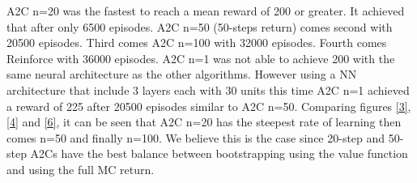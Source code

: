 \documentclass[12pt]{article}
\begin{document}
\begin{enumerate}
		A2C n=20 was the fastest to reach a mean reward of 200 or greater. It achieved that after only 6500 episodes.
		A2C n=50 (50-steps return) comes second with 20500 episodes.  
		Third comes A2C n=100 with 32000 episodes. 
		Fourth comes Reinforce with 36000 episodes. 
		A2C n=1 was not able to achieve 200 with the same neural architecture as the other algorithms. However using a NN architecture that include 3 layers each with 30 units this time A2C n=1 achieved a reward of 225 after 20500 episodes similar to A2C n=50.
		Comparing figures \ref{3}, \ref{4} and \ref{6},
		it can be seen that A2C n=20 has the steepest rate of learning then comes n=50 and finally n=100. 
		We believe this is the case since 20-step and 50-step A2Cs have the best balance between bootstrapping using the value function and using the full MC return.
		
		
		
		
	\end{enumerate}
	
	
	
	
\end{document}
